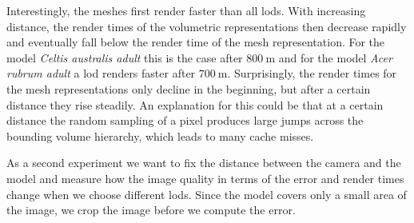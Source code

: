 Interestingly, the meshes first render faster than all \acsp{lod}.
With increasing distance, the render times of the volumetric representations then decrease rapidly and eventually fall below the render time of the mesh representation.
For the model \textit{Celtis australis adult} this is the case after $\SI{800}{\m}$ and for the model \textit{Acer rubrum adult} a \ac{lod} renders faster after $\SI{700}{\m}$.
Surprisingly, the render times for the mesh representations only decline in the beginning, but after a certain distance they rise steadily.
An explanation for this could be that at a certain distance the random sampling of a pixel produces large jumps across the bounding volume hierarchy, which leads to many cache misses.


As a second experiment we want to fix the distance between the camera and the model and measure how the image quality in terms of the \FLIP error and render times change when we choose different \acsp{lod}.
Since the model covers only a small area of the image, we crop the image before we compute the \FLIP error.
